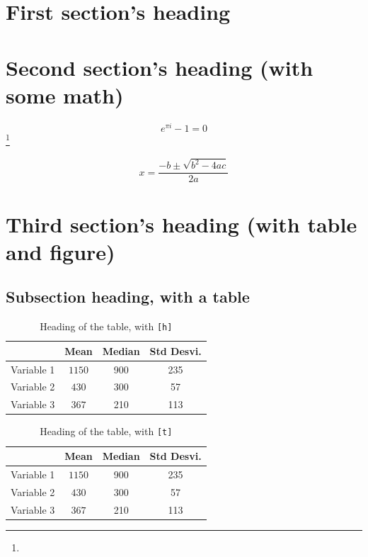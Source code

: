 \documentclass[12pt]{bppaper}
\begin{document}
\section{First section's heading}

\blindtext

\blindtext

\section{Second section's heading (with some math)}

\blindtext
$$e^{\pi i} - 1 = 0$$
\blindtext\footnote{\blindtext}

\blindtext
\begin{equation}
x = \frac{-b \pm \sqrt{b^2 - 4ac}}{2a}
\end{equation}
\blindtext 

\section{Third section's heading (with table and figure)}

\blindtext

\subsection{Subsection heading, with a table}

\blindtext
\begin{table}[h]
\centering
\caption{Heading of the table, with \texttt{[h]}}
\begin{tabular}{cccc} \toprule
    & Mean & Median & Std Desvi.\\ \midrule
    Variable 1 & $1150$ & 900 & 235 \\ 
    Variable 2 & $430$ & 300 & 57 \\ 
    Variable 3 & $367$ & 210 & 113 \\ \bottomrule
\end{tabular}
\end{table}
\blindtext

\blindtext
\begin{table}[t]
\centering
\caption{Heading of the table, with \texttt{[t]}}
\begin{tabular}{cccc} \toprule
    & Mean & Median & Std Desvi.\\ \midrule
    Variable 1 & $1150$ & 900 & 235 \\ 
    Variable 2 & $430$ & 300 & 57 \\ 
    Variable 3 & $367$ & 210 & 113 \\ \bottomrule
\end{tabular}\par
\end{table}
\blindtext
\blindtext
\end{document}

